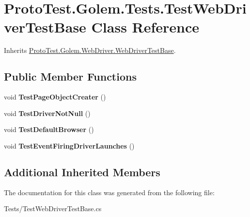 \hypertarget{class_proto_test_1_1_golem_1_1_tests_1_1_test_web_driver_test_base}{\section{Proto\-Test.\-Golem.\-Tests.\-Test\-Web\-Driver\-Test\-Base Class Reference}
\label{class_proto_test_1_1_golem_1_1_tests_1_1_test_web_driver_test_base}
}


Inherits \hyperlink{class_proto_test_1_1_golem_1_1_web_driver_1_1_web_driver_test_base}{Proto\-Test.\-Golem.\-Web\-Driver.\-Web\-Driver\-Test\-Base}.

\subsection*{Public Member Functions}
\begin{DoxyCompactItemize}
\item 
\hypertarget{class_proto_test_1_1_golem_1_1_tests_1_1_test_web_driver_test_base_ad2b34cfe8ce4ec785d67467aaeeda784}{void {\bfseries Test\-Page\-Object\-Creater} ()}\label{class_proto_test_1_1_golem_1_1_tests_1_1_test_web_driver_test_base_ad2b34cfe8ce4ec785d67467aaeeda784}

\item 
\hypertarget{class_proto_test_1_1_golem_1_1_tests_1_1_test_web_driver_test_base_ab59abacaeddea7cadad9fb7d1b7a6d08}{void {\bfseries Test\-Driver\-Not\-Null} ()}\label{class_proto_test_1_1_golem_1_1_tests_1_1_test_web_driver_test_base_ab59abacaeddea7cadad9fb7d1b7a6d08}

\item 
\hypertarget{class_proto_test_1_1_golem_1_1_tests_1_1_test_web_driver_test_base_a355af0689030de375f36b60a4e0163af}{void {\bfseries Test\-Default\-Browser} ()}\label{class_proto_test_1_1_golem_1_1_tests_1_1_test_web_driver_test_base_a355af0689030de375f36b60a4e0163af}

\item 
\hypertarget{class_proto_test_1_1_golem_1_1_tests_1_1_test_web_driver_test_base_a9be0601dcf3385133f9ce75bc5aa7d63}{void {\bfseries Test\-Event\-Firing\-Driver\-Launches} ()}\label{class_proto_test_1_1_golem_1_1_tests_1_1_test_web_driver_test_base_a9be0601dcf3385133f9ce75bc5aa7d63}

\end{DoxyCompactItemize}
\subsection*{Additional Inherited Members}


The documentation for this class was generated from the following file\-:\begin{DoxyCompactItemize}
\item 
Tests/Test\-Web\-Driver\-Test\-Base.\-cs\end{DoxyCompactItemize}
